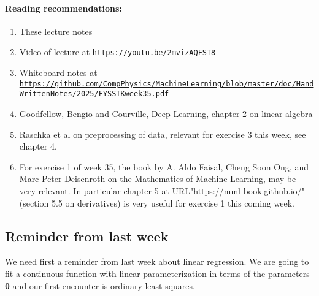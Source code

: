 \documentclass[%
oneside,                 %
final,                   %
10pt]{article}
\begin{document}
\noindent
\paragraph{Reading recommendations:}
\begin{enumerate}
\item These lecture notes

\item Video of lecture at \href{{https://youtu.be/2mvizAQFST8}}{\nolinkurl{https://youtu.be/2mvizAQFST8}}

\item Whiteboard notes  at \href{{https://github.com/CompPhysics/MachineLearning/blob/master/doc/HandWrittenNotes/2025/FYSSTKweek35.pdf}}{\nolinkurl{https://github.com/CompPhysics/MachineLearning/blob/master/doc/HandWrittenNotes/2025/FYSSTKweek35.pdf}}

\item Goodfellow, Bengio and Courville, Deep Learning, chapter 2 on linear algebra

\item Raschka et al on preprocessing of data, relevant for exercise 3 this week, see chapter 4.

\item For exercise 1 of week 35, the book by A. Aldo Faisal, Cheng Soon Ong, and Marc Peter Deisenroth on the Mathematics of Machine Learning, may be very relevant. In particular chapter 5 at URL"https://mml-book.github.io/" (section 5.5 on derivatives) is very useful for exercise 1 this coming week.
\end{enumerate}

\noindent
\subsection{Reminder from last week}

We need first a reminder from last week about linear regression. We are going to fit a continuous function with linear parameterization in terms of the parameters  $\bm{\theta}$ and our first encounter is ordinary least squares.
\end{document}
